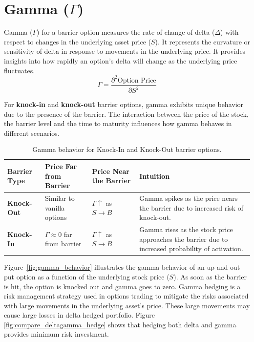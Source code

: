 \section{Gamma (\(\Gamma\))}

Gamma (\(\Gamma\)) for a barrier option measures the rate of change of delta (\(\Delta\)) with respect to changes in the underlying asset price (\(S\)). It represents the curvature or sensitivity of delta in response to movements in the underlying price. It provides insights into how rapidly an option's delta will change as the underlying price fluctuates.
\[
\Gamma = \frac{\partial^2 \text{Option Price}}{\partial S^2}
\]

For \textbf{knock-in} and \textbf{knock-out} barrier options, gamma exhibits unique behavior due to the presence of the barrier. The interaction between the price of the stock, the barrier level and the time to maturity influences how gamma behaves in different scenarios.

\begin{center}
	\begin{table}[H]
		\begin{tabular}{ | m{3cm} | m{5cm}| m{4cm} | m{4cm}|} 
			\hline
			\textbf{Barrier Type} & \textbf{Price Far from Barrier} & \textbf{Price Near the Barrier} & \textbf{Intuition}  \\ 
			\hline
			\textbf{Knock-Out} & Similar to vanilla options     & $\Gamma \uparrow$ as $S \to B$  & Gamma spikes as the price nears the barrier due to increased risk of knock-out. \\ 
			\hline
			\textbf{Knock-In}    & $\Gamma \approx 0$ far from barrier   & $\Gamma \uparrow$ as $S \to B$  & Gamma rises as the stock price approaches the barrier due to increased probability of activation. \\ 
			\hline
		\end{tabular}
\caption{Gamma behavior for Knock-In and Knock-Out barrier options.}
\label{tab:gamma_barrier_options}
	\end{table}
\end{center}

Figure~\ref{fig:gamma_behavior} illustrates the gamma behavior of an up-and-out put option as a function of the underlying stock price (\(S\)). As soon as the barrier is hit, the option is knocked out and gamma goes to zero. Gamma hedging is a risk management strategy used in options trading to mitigate the risks associated with large movements in the underlying asset's price. These large movements may cause large losses in delta hedged portfolio. Figure \ref{fig:compare_deltagamma_hedge} shows that hedging both delta and gamma provides minimum risk investment.

